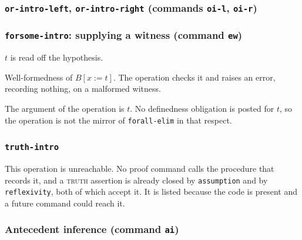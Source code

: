 \subsubsection*{\texttt{or-intro-left}, \texttt{or-intro-right}
  (commands \texttt{oi-l}, \texttt{oi-r})}

\label{kop:or-intro-left}%
\label{kop:or-intro-right}%

\subsubsection*{\texttt{forsome-intro}: supplying a witness (command \texttt{ew})}

\label{kop:forsome-intro}%
\begin{VNBcond}
\item[Matching] $t$ is read off the hypothesis.
\item[Not checked] Well-formedness of $B[x{:=}t]$.  The operation
  checks it and raises an error, recording nothing, on a malformed
  witness.
\end{VNBcond}
The argument of the operation is $t$.  No definedness obligation is
posted for $t$, so the operation is not the mirror of
\texttt{forall-elim} in that respect.

\subsubsection*{\texttt{truth-intro}}

\label{kop:truth-intro}%

This operation is unreachable.  No proof command calls the procedure
that records it, and a \textsc{truth} assertion is already closed by
\texttt{assumption} and by \texttt{reflexivity}, both of which accept it.
It is listed because the code is present and a future command could
reach it.

\subsubsection*{Antecedent inference (command \texttt{ai})}

